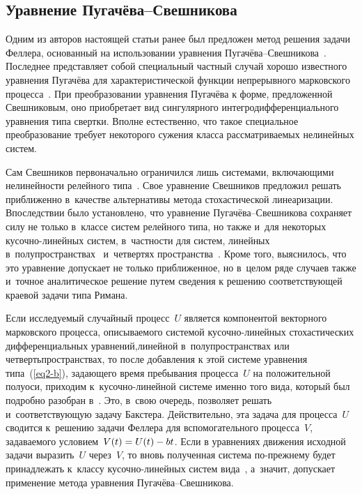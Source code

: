 \begin{multicols}{2}
\section{Уравнение Пугачёва--Свешникова}

Одним из авторов настоящей статьи ранее был предложен метод решения задачи Феллера, основанный на использовании уравнения Пу\-га\-чё\-ва--Свеш\-ни\-ко\-ва~\cite{ref14}. Последнее представляет \mbox{собой} специальный частный случай хорошо известного уравнения Пугачёва для характеристической функции непрерывного марковского процесса~\cite{ref22}. При преобразовании уравнения Пугачёва к форме, предложенной Свешниковым, оно приобретает вид сингулярного интегродифференциального уравнения типа свертки. Вполне естественно, что такое специальное преобразование требует некоторого сужения класса рассматриваемых нелинейных систем.

Сам Свешников первоначально ограничился лишь системами, включающими нелинейности релейного типа~\cite{ref25,ref26}. Свое уравнение Свешников предложил решать приближенно в~качестве альтернативы метода стохастической линеаризации. Впоследст\-вии было установлено, что уравнение Пу\-га\-чё\-ва--Свеш\-ни\-ко\-ва сохраняет силу не только в~классе систем релейного типа, но также и~для некоторых ку\-соч\-но-ли\-ней\-ных систем, в~част\-ности для систем, линейных в~полупространствах~\cite{ref15} и~четвертях пространства~\cite{ref15a}. Кроме того, выяснилось, что это уравнение допускает не только приближенное, но в~целом ряде случаев также и~точное аналитическое решение путем сведения к решению соответствующей краевой задачи типа Римана.

Если исследуемый случайный процесс~$U$ явля\-ется компонентой векторного марковского процесса, описываемого системой ку\-соч\-но-ли\-ней\-ных стохастических дифференциальных уравнений,\linebreak линейной в~полупространствах или четвертьпространствах, то после добавления к этой системе уравнения типа~(\ref{eq2-b}), задающего время пребывания процесса~$U$ на положительной полуоси, приходим к~ку\-соч\-но-ли\-ней\-ной системе именно того вида, который был подробно разобран в~\cite{ref15, ref15a}. Это, в~свою очередь, позволяет решать и~со\-от\-вет\-ст\-ву\-ющую задачу Бакстера. Действительно, эта задача для процесса~$U$ сводится к~решению задачи Феллера для вспомогательного процесса~$V$, задаваемого условием~$V(t)\hm = U(t)\hm - b t$. Если в уравнениях движения исходной задачи выразить~$U$ через~$V$, то вновь полученная система по-прежнему будет принадлежать к~классу ку\-соч\-но-ли\-ней\-ных сис\-тем вида~\cite{ref15, ref15a}, а~значит, допускает применение метода уравнения Пу\-га\-чё\-ва--Свеш\-ни\-кова.


\end{multicols}

